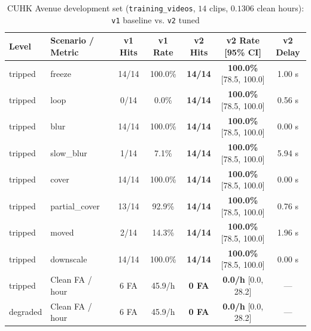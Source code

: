 \begin{table}[!ht]
  \centering
  \caption{CUHK Avenue development set (\texttt{training\_videos}, $14$ clips, $0.1306$ clean hours): \texttt{v1} baseline vs. \texttt{v2} tuned}
  \label{tab:avenue_train}
  \begin{tabular}{@{}llccccc@{}}
    \toprule
    \textbf{Level} & \textbf{Scenario / Metric} & \textbf{v1 Hits} & \textbf{v1 Rate} & \textbf{v2 Hits} & \textbf{v2 Rate [95\% CI]} & \textbf{v2 Delay} \\
    \midrule
    tripped & freeze & 14/14 & 100.0\% & \textbf{14/14} & \textbf{100.0\%} [78.5, 100.0] & 1.00 s \\
    tripped & loop & 0/14 & 0.0\% & \textbf{14/14} & \textbf{100.0\%} [78.5, 100.0] & 0.56 s \\
    tripped & blur & 14/14 & 100.0\% & \textbf{14/14} & \textbf{100.0\%} [78.5, 100.0] & 0.00 s \\
    tripped & slow\_blur & 1/14 & 7.1\% & \textbf{14/14} & \textbf{100.0\%} [78.5, 100.0] & 5.94 s \\
    tripped & cover & 14/14 & 100.0\% & \textbf{14/14} & \textbf{100.0\%} [78.5, 100.0] & 0.00 s \\
    tripped & partial\_cover & 13/14 & 92.9\% & \textbf{14/14} & \textbf{100.0\%} [78.5, 100.0] & 0.76 s \\
    tripped & moved & 2/14 & 14.3\% & \textbf{14/14} & \textbf{100.0\%} [78.5, 100.0] & 1.96 s \\
    tripped & downscale & 14/14 & 100.0\% & \textbf{14/14} & \textbf{100.0\%} [78.5, 100.0] & 0.00 s \\
    \midrule
    tripped & Clean FA / hour & 6 FA & 45.9/h & \textbf{0 FA} & \textbf{0.0/h} [0.0, 28.2] & --- \\
    degraded & Clean FA / hour & 6 FA & 45.9/h & \textbf{0 FA} & \textbf{0.0/h} [0.0, 28.2] & --- \\
    \bottomrule
  \end{tabular}
\end{table}

